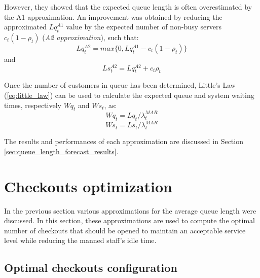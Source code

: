 However, they showed that the expected queue length is often overestimated by the A1 approximation. An improvement was obtained by reducing the approximated \( Lq_t^{A1} \) value by the expected number of non-busy servers \( c_t (1 - \rho_t) \) (\emph{A2 approximation}), such that:
\begin{equation}
  Lq_t^{A2} = max\{0, Lq_t^{A1} - c_t (1 - \rho_t)\}
\end{equation}
and
\begin{equation}
  Ls_t^{A2} = Lq_t^{A2} + c_t \rho_t
\end{equation}

Once the number of customers in queue has been determined, Little’s Law (\ref{eq:little_law})\cite{little} can be used to calculate the expected queue and system waiting times, respectively \( Wq_t \) and \( Ws_t \), as:
\begin{equation}
  Wq_t = Lq_t / \lambda^{MAR}_t
\end{equation}
\begin{equation}
  Ws_t = Ls_t / \lambda^{MAR}_t
\end{equation}

The results and performances of each approximation are discussed in Section \ref{sec:queue_length_forecast_results}.

\section{Checkouts optimization}
\label{sec:checkouts_optimization}

In the previous section various approximations for the average queue length were discussed. In this section, these approximations are used to compute the optimal number of checkouts that should be opened to maintain an acceptable service level while reducing the manned staff’s idle time.

\subsection{Optimal checkouts configuration}
\label{subsec:optimal_checkouts_configuration}

